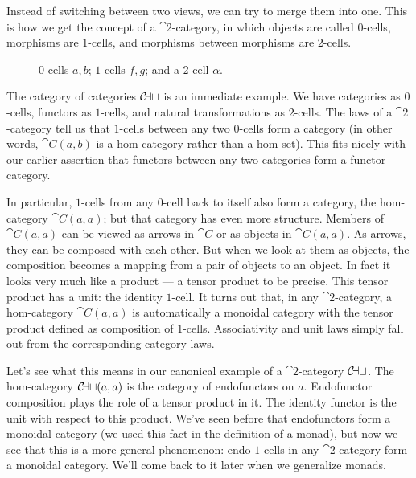 Instead of switching between two views, we can try to merge them into
one. This is how we get the concept of a $\cat{2}$-category, in which objects
are called $0$-cells, morphisms are $1$-cells, and morphisms between
morphisms are $2$-cells.

\begin{figure}[H]
\centering
{}
\caption{$0$-cells $a, b$; $1$-cells $f, g$; and a $2$-cell $\alpha$.}
\end{figure}

\noindent
The category of categories $\mathcal{C\mkern-3mu at}$ is an immediate example. We have
categories as $0$-cells, functors as $1$-cells, and natural transformations
as $2$-cells. The laws of a $\cat{2}$-category tell us that $1$-cells between any
two $0$-cells form a category (in other words, $\cat{C}(a, b)$ is a
hom-category rather than a hom-set). This fits nicely with our earlier
assertion that functors between any two categories form a functor
category.

In particular, $1$-cells from any $0$-cell back to itself also form a
category, the hom-category $\cat{C}(a, a)$; but that category has even
more structure. Members of $\cat{C}(a, a)$ can be viewed as arrows in
$\cat{C}$ or as objects in $\cat{C}(a, a)$. As arrows, they can be
composed with each other. But when we look at them as objects, the
composition becomes a mapping from a pair of objects to an object. In
fact it looks very much like a product --- a tensor product to be
precise. This tensor product has a unit: the identity $1$-cell. It turns
out that, in any $\cat{2}$-category, a hom-category $\cat{C}(a, a)$ is
automatically a monoidal category with the tensor product defined as
composition of $1$-cells. Associativity and unit laws simply fall out from
the corresponding category laws.

Let's see what this means in our canonical example of a $\cat{2}$-category
$\mathcal{C\mkern-3mu at}$. The hom-category $\mathcal{C\mkern-3mu at}(a, a)$ is the category of
endofunctors on $a$. Endofunctor composition plays the role of a
tensor product in it. The identity functor is the unit with respect to
this product. We've seen before that endofunctors form a monoidal
category (we used this fact in the definition of a monad), but now we
see that this is a more general phenomenon: endo-$1$-cells in any
$\cat{2}$-category form a monoidal category. We'll come back to it later when we
generalize monads.

